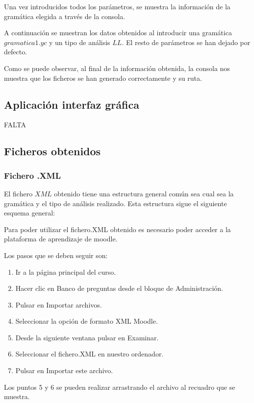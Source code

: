 Una vez introducidos todos los parámetros, se muestra la información de la gramática elegida a través de la consola.

A continuación se muestran los datos obtenidos al introducir una gramática $gramatica1.yc$ y un tipo de análisis $LL$. El resto de parámetros se han dejado por defecto.


Como se puede observar, al final de la información obtenida, la consola nos muestra que los ficheros se han generado correctamente y su ruta.


\subsection{Aplicación interfaz gráfica}
FALTA


\subsection{Ficheros obtenidos}
\subsubsection{Fichero .XML}

El fichero $XML$ obtenido tiene una estructura general común sea cual sea la gramática y el tipo de análisis realizado. Esta estructura sigue el siguiente esquema general:

Para poder utilizar el fichero.XML obtenido es necesario poder acceder a la plataforma de aprendizaje de moodle.

Los pasos que se deben seguir son:
\begin{enumerate}
\item Ir a la página principal del curso.
\item Hacer clic en Banco de preguntas desde el bloque de Administración.
\item Pulsar en Importar archivos.
\item Seleccionar la opción de formato XML Moodle.
\item Desde la siguiente ventana pulsar en Examinar.
\item Seleccionar el fichero.XML en nuestro ordenador.
\item Pulsar en Importar este archivo.




\end{enumerate}
Los puntos 5 y 6 se pueden realizar arrastrando el archivo al recuadro que se muestra.

